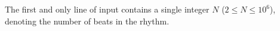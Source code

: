 
The first and only line of input contains a single integer $N$ ($2 \leq N \leq 10^6$), denoting the number of beats in the rhythm.

